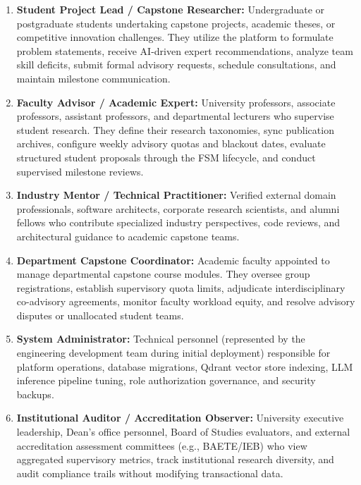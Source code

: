 \begin{enumerate}[label=\textbf{\arabic*.}]
    \item \textbf{Student Project Lead / Capstone Researcher:} Undergraduate or postgraduate students undertaking capstone projects, academic theses, or competitive innovation challenges. They utilize the platform to formulate problem statements, receive AI-driven expert recommendations, analyze team skill deficits, submit formal advisory requests, schedule consultations, and maintain milestone communication.
    
    \item \textbf{Faculty Advisor / Academic Expert:} University professors, associate professors, assistant professors, and departmental lecturers who supervise student research. They define their research taxonomies, sync publication archives, configure weekly advisory quotas and blackout dates, evaluate structured student proposals through the FSM lifecycle, and conduct supervised milestone reviews.
    
    \item \textbf{Industry Mentor / Technical Practitioner:} Verified external domain professionals, software architects, corporate research scientists, and alumni fellows who contribute specialized industry perspectives, code reviews, and architectural guidance to academic capstone teams.
    
    \item \textbf{Department Capstone Coordinator:} Academic faculty appointed to manage departmental capstone course modules. They oversee group registrations, establish supervisory quota limits, adjudicate interdisciplinary co-advisory agreements, monitor faculty workload equity, and resolve advisory disputes or unallocated student teams.
    
    \item \textbf{System Administrator:} Technical personnel (represented by the engineering development team during initial deployment) responsible for platform operations, database migrations, Qdrant vector store indexing, LLM inference pipeline tuning, role authorization governance, and security backups.
    
    \item \textbf{Institutional Auditor / Accreditation Observer:} University executive leadership, Dean's office personnel, Board of Studies evaluators, and external accreditation assessment committees (e.g., BAETE/IEB) who view aggregated supervisory metrics, track institutional research diversity, and audit compliance trails without modifying transactional data.
\end{enumerate}

